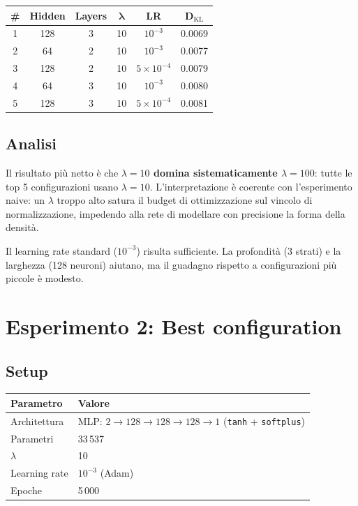 \documentclass[11pt, a4paper]{article}
\begin{document}
\begin{center}
\begin{tabular}{cccccc}
\toprule
\textbf{\#} & \textbf{Hidden} & \textbf{Layers} & $\boldsymbol{\lambda}$ & \textbf{LR} & $\boldsymbol{D_\mathrm{KL}}$ \\
\midrule
1 & 128 & 3 & 10 & $10^{-3}$ & 0.0069 \\
2 & 64  & 2 & 10 & $10^{-3}$ & 0.0077 \\
3 & 128 & 2 & 10 & $5\!\times\!10^{-4}$ & 0.0079 \\
4 & 64  & 3 & 10 & $10^{-3}$ & 0.0080 \\
5 & 128 & 3 & 10 & $5\!\times\!10^{-4}$ & 0.0081 \\
\bottomrule
\end{tabular}
\end{center}

\subsection{Analisi}

Il risultato più netto è che \textbf{$\lambda = 10$ domina sistematicamente $\lambda = 100$}: tutte le top 5 configurazioni usano $\lambda = 10$. L'interpretazione è coerente con l'esperimento naive: un $\lambda$ troppo alto satura il budget di ottimizzazione sul vincolo di normalizzazione, impedendo alla rete di modellare con precisione la forma della densità.

Il learning rate standard ($10^{-3}$) risulta sufficiente. La profondità (3 strati) e la larghezza (128 neuroni) aiutano, ma il guadagno rispetto a configurazioni più piccole è modesto.

\section{Esperimento 2: Best configuration}

\subsection{Setup}

\begin{center}
\begin{tabular}{ll}
\toprule
\textbf{Parametro} & \textbf{Valore} \\
\midrule
Architettura & MLP: $2 \to 128 \to 128 \to 128 \to 1$ (\texttt{tanh} + \texttt{softplus}) \\
Parametri & 33\,537 \\
$\lambda$ & 10 \\
Learning rate & $10^{-3}$ (Adam) \\
Epoche & 5\,000 \\
\bottomrule
\end{tabular}
\end{center}
\end{document}
